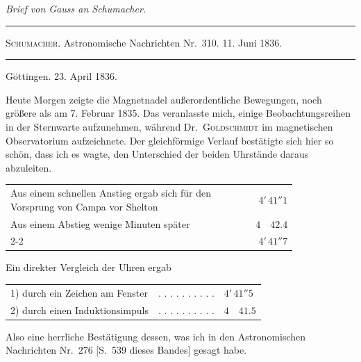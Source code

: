 \vspace{6mm}
\begin{center}
{\large\itshape Brief von Gauss an Schumacher.\par}
\vspace{5mm}\hrule\vspace{2mm}
{\small \textsc{Schumacher}. Astronomische Nachrichten Nr.\ 310. 11. Juni 1836.\par}
\vspace{2mm}\hrule\vspace{5mm}
\end{center}
\begin{flushright}Göttingen. 23. April 1836.\end{flushright}
Heute Morgen zeigte die Magnetnadel außerordentliche Bewegungen, noch größere als am 7. Februar 1835. Das veranlasste mich, einige Beobachtungsreihen in der Sternwarte aufzunehmen, während Dr.\ \textsc{Goldschmidt} im magnetischen Observatorium aufzeichnete. Der gleichförmige Verlauf bestätigte sich hier so schön, dass ich es wagte, den Unterschied der beiden Uhrstände daraus abzuleiten.

\begin{center}\small
\begin{tabular}{@{}p{0.82\linewidth}r@{}}
Aus einem schnellen Anstieg ergab sich für den Vorsprung von Campa vor Shelton & $4'\,41''1$\\
Aus einem Abstieg wenige Minuten später & $4\quad42.4$\\\cline{2-2}
\multicolumn{1}{r}{Mittel} & $4'\,41''7$
\end{tabular}
\end{center}
Ein direkter Vergleich der Uhren ergab
\begin{center}\small
\begin{tabular}{@{}lll@{}}
1) durch ein Zeichen am Fenster & . . . . . . . . . . & $4'\,41''5$\\
2) durch einen Induktionsimpuls & . . . . . . . . . . & $4\quad41.5$
\end{tabular}
\end{center}
Also eine herrliche Bestätigung dessen, was ich in den Astronomischen Nachrichten Nr.\ 276 [S.\ 539 dieses Bandes] gesagt habe.

\clearpage
